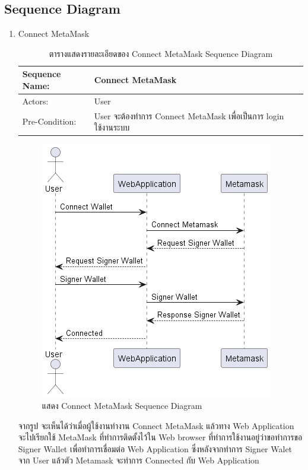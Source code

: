 \documentclass[12pt,oneside,openright,a4paper]{cpe-thai-project}
\begin{document}
\subsection{Sequence Diagram}
	\begin{enumerate}[label=\thesubsection.\arabic*,leftmargin=0pt,itemindent=1.25cm]
	\item Connect MetaMask
		\begin{table}[h]
		\centering
		\caption{ตารางแสดงรายละเอียดของ Connect MetaMask Sequence Diagram}
		\begin{tabularx}{\textwidth}{|l|X|X|} 
			\hline
			Sequence Name: & Connect MetaMask                                                 \\ 
			\hline
			Actors:        & User                                                             \\ 
			\hline
			Pre-Condition: & User จะต้องทำการ Connect MetaMask เพื่อเป็นการ login ใช้งานระบบ  \\
			\hline
		\end{tabularx}
		\end{table}
		\begin{figure}[!thb]
			\centering
			\includegraphics[scale=0.6]{connectMetamaskSeq}
			\caption{แสดง Connect MetaMask Sequence Diagram}
		\end{figure}
		\FloatBarrier
	\tab จากรูป จะเห็นได้ว่าเมื่อผู้ใช้งานทํางาน Connect MetaMask แล้วทาง Web Application จะไปเรียกใช้ MetaMask ที่ทําการติดตั้งไว้ใน Web browser ที่ทําการใช้งานอยู่ว่าขอทำการขอ Signer Wallet เพื่อทําการเชื่อมต่อ Web Application ซึ่งหลังจากทําการ Signer Walet จาก User แล้วตัว Metamask จะทำการ Connected กับ Web Application

\end{enumerate}
\end{document}

